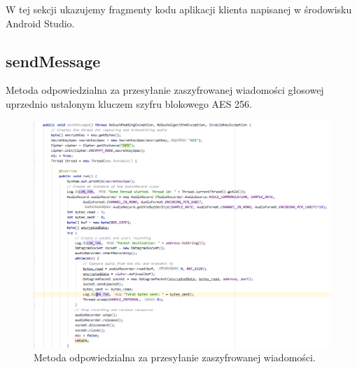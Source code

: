 \color{red}
W tej sekcji ukazujemy fragmenty kodu aplikacji klienta napisanej w środowisku Android Studio.

\subsection{sendMessage}
Metoda odpowiedzialna za przesyłanie zaszyfrowanej wiadomości głosowej uprzednio ustalonym kluczem szyfru blokowego AES 256.

\begin{figure}[H]
	\includegraphics[width=\textwidth]{images/code3.png}
	\centering	
	\caption{\centering Metoda odpowiedzialna za przesyłanie zaszyfrowanej wiadomości.}
\end{figure}